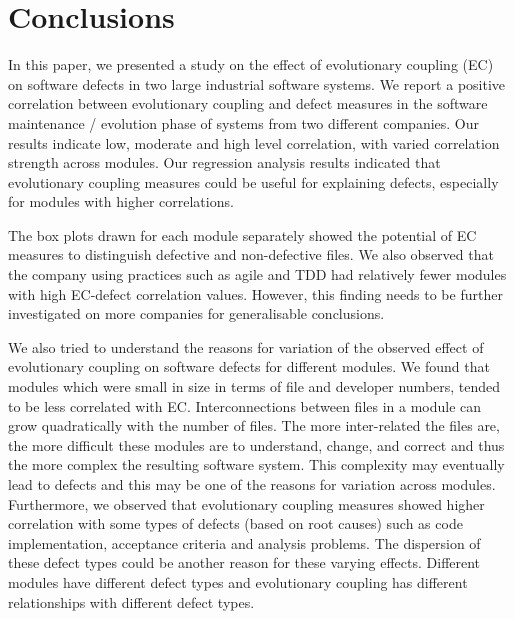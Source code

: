 \documentclass[times]{smrauth}
\begin{document}
\section{Conclusions}

In this paper, we presented a study on the effect of evolutionary coupling (EC) on software defects in two large industrial software systems. We report a positive correlation between evolutionary coupling and defect measures in the software maintenance / evolution phase of systems from two different companies. Our results indicate low, moderate and high level correlation, with varied correlation strength across modules. Our regression analysis results indicated that evolutionary coupling measures could be useful for explaining defects, especially for modules with higher correlations.  


The box plots drawn for each module separately showed the potential of EC measures to distinguish  defective and non-defective files. We also observed that the company using practices such as agile and TDD had relatively fewer modules with high EC-defect correlation values. However, this finding needs to be further investigated on more companies for generalisable conclusions.

We also tried to understand the reasons for variation of the observed effect of evolutionary coupling on software defects for different modules. We found that modules which were small in size in terms of file and developer numbers, tended to be less correlated with EC. Interconnections between files in a module can grow quadratically with the number of files. The more inter-related the files are, the more difficult these modules are to understand, change, and correct and thus the more complex the resulting software system. This complexity may eventually lead to defects and this may be one of the reasons for variation across modules. Furthermore, we observed that evolutionary coupling measures showed higher correlation with some types of defects (based on root causes) such as code implementation, acceptance criteria and analysis problems. The dispersion of these defect types could be another reason for these varying effects. Different modules have different defect types and evolutionary coupling has different relationships with different defect types. %
\end{document}
